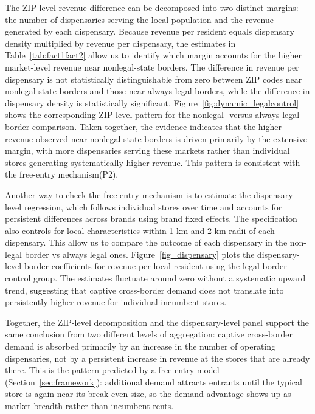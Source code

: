 \documentclass[english,12pt]{article}
\begin{document}
\FloatBarrier

The ZIP-level revenue difference can be decomposed into two distinct margins: the number of dispensaries serving the local population and the revenue generated by each dispensary. Because revenue per resident equals dispensary density multiplied by revenue per dispensary, the estimates in Table~\ref{tab:fact1fact2} allow us to identify which margin accounts for the higher market-level revenue near nonlegal-state borders. The difference in revenue per dispensary is not statistically distinguishable from zero between ZIP codes near nonlegal-state borders and those near always-legal borders, while the difference in dispensary density is statistically significant. Figure~\ref{fig:dynamic_legalcontrol} shows the corresponding ZIP-level pattern for the nonlegal- versus always-legal-border comparison. Taken together, the evidence indicates that the higher revenue observed near nonlegal-state borders is driven primarily by the extensive margin, with more dispensaries serving these markets rather than individual stores generating systematically higher revenue. This pattern is consistent with the free-entry mechanism(P2).


Another way to check the free entry mechanism is to estimate the dispensary-level regression, which follows individual stores over time and accounts for persistent differences across brands using brand fixed effects. The specification also controls for local characteristics within 1-km and 2-km radii of each dispensary. This allow us to compare the outcome of each dispensary in the non-legal border vs always legal ones. Figure~\ref{fig_dispensary} plots the dispensary-level border coefficients for revenue per local resident using the legal-border control group. The estimates fluctuate around zero without a systematic upward trend, suggesting that captive cross-border demand does not translate into persistently higher revenue for individual incumbent stores.

Together, the ZIP-level decomposition and the dispensary-level panel support the same conclusion from two different levels of aggregation: captive cross-border demand is absorbed primarily by an increase in the number of operating dispensaries, not by a persistent increase in revenue at the stores that are already there. This is the pattern predicted by a free-entry model (Section~\ref{sec:framework}): additional demand attracts entrants until the typical store is again near its break-even size, so the demand advantage shows up as market breadth rather than incumbent rents.
\end{document}
